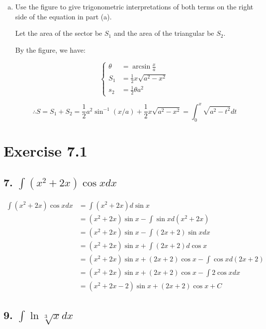 \documentclass{article}
\begin{document}
\begin{enumerate}[(a)]
        \item Use the figure to give trigonometric interpretations of both terms on the right side of the equation in part (a).

        Let the area of the sector be $S_1$ and the area of the triangular be $S_2$.

        By the figure, we have:

        $$\left\{ \begin{array}{ll}
            \theta &= \arcsin \frac{x}{a} \\
            S_{1} &= \frac{1}{2} x \sqrt{a^2 - x^2} \\
            s_{2} &= \frac{1}{2} \theta a^2
        \end{array} \right.$$

        $$\therefore S = S_1 + S_2 = \frac 1 2 a^2 \sin^{-1}(x / a) + \frac 1 2 x \sqrt{a^2 - x^2} = \int_0^x \sqrt{a^2 - t^2} dt$$

    \end{enumerate}

    \section*{Exercise 7.1}

    \subsection*{7. $\int (x^2 + 2x) \cos x dx$}

    $$\begin{aligned}
        \int (x^2 + 2x) \cos x dx &= \int (x^2 + 2x) d\sin x \\
        &= (x^2 + 2x) \sin x - \int \sin x d(x^2 + 2x) \\
        &= (x^2 + 2x) \sin x - \int (2x + 2) \sin x dx \\
        &= (x^2 + 2x) \sin x + \int (2x + 2) d \cos x \\
        &= (x^2 + 2x) \sin x + (2x + 2) \cos x - \int \cos x d(2x + 2) \\
        &= (x^2 + 2x) \sin x + (2x + 2) \cos x - \int 2 \cos x dx \\
        &= (x^2 + 2x - 2) \sin x + (2x + 2) \cos x + C
    \end{aligned}$$

    \subsection*{9. $\int \ln \sqrt[3]{x} dx$}
\end{document}
